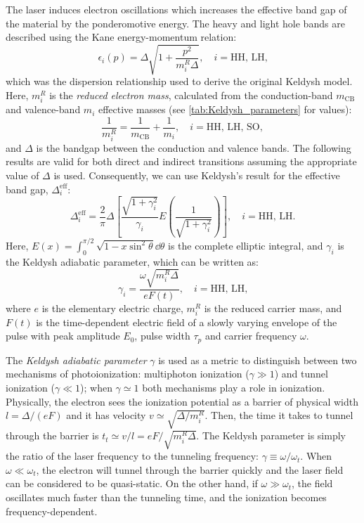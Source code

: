 The laser induces electron oscillations which increases the effective band gap of the material by the ponderomotive energy. The heavy and light hole bands are described using the Kane energy-momentum relation:
\begin{equation}
\epsilon_i(p) = \Delta \sqrt{1+\frac{p^2}{m_i^R \Delta}}, \quad i = \textrm{HH, LH,}
\end{equation}
which was the dispersion relationship used to derive the original Keldysh model. Here, $m_i^R$ is the \textit{reduced electron mass}, calculated from the conduction-band $m_{\textrm{CB}}$ and valence-band $m_i$ effective masses (see \cref{tab:Keldysh_parameters} for values):
\begin{equation}
\frac{1}{m_i^R} = \frac{1}{m_{\textrm{CB}}} + \frac{1}{m_i}, \quad i = \textrm{HH, LH, SO},
\label{eqn:reduced_electron_mass}
\end{equation}
and $\Delta$ is the bandgap between the conduction and valence bands. The following results are valid for both direct and indirect transitions assuming the appropriate value of $\Delta$ is used. Consequently, we can use Keldysh's result for the effective band gap, $\Delta_i^{\textrm{eff}}$:
\begin{equation}
\Delta_i^{\textrm{eff}} = \frac{2}{\pi} \Delta \left[ \frac{\sqrt{1+\gamma_i^2}}{\gamma_i} E\left(\frac{1}{\sqrt{1+\gamma_i^2}}\right) \right], \quad i = \textrm{HH, LH.}
\label{eqn:eff_bandgap_HHLL}
\end{equation}
Here, $E(x) = \int_{0}^{\pi/2} \sqrt{1 - x \sin^2 \theta} \dd{\theta}$ is the complete elliptic integral, and $\gamma_i$ is the Keldysh adiabatic parameter, which can be written as:
\begin{equation}
\gamma_i = \frac{\omega \sqrt{m_i^R \Delta}}{e F(t)}, \quad i = \textrm{HH, LH,}
\end{equation}
where $e$ is the elementary electric charge, $m_i^R$ is the reduced carrier mass, and $F(t)$ is the time-dependent electric field of a slowly varying envelope of the pulse with peak amplitude $E_0$, pulse width $\tau_p$ and carrier frequency $\omega$.

The \textit{Keldysh adiabatic parameter} $\gamma$ is used as a metric to distinguish between two mechanisms of photoionization: multiphoton ionization ($\gamma \gg 1$) and tunnel ionization ($\gamma \ll 1$); when $\gamma \simeq 1$ both mechanisms play a role in ionization. Physically, the electron sees the ionization potential as a barrier of physical width $l = \Delta / (e F)$ and it has velocity $v \simeq \sqrt{\Delta / m_i^R}$. Then, the time it takes to tunnel through the barrier is $t_t \simeq v/l = eF / \sqrt{m_i^R \Delta}$. The Keldysh parameter is simply the ratio of the laser frequency to the tunneling frequency: $\gamma \equiv \omega / \omega_t$. When $\omega \ll \omega_t$, the electron will tunnel through the barrier quickly and the laser field can be considered to be quasi-static. On the other hand, if $\omega \gg \omega_t$, the field oscillates much faster than the tunneling time, and the ionization becomes frequency-dependent.

